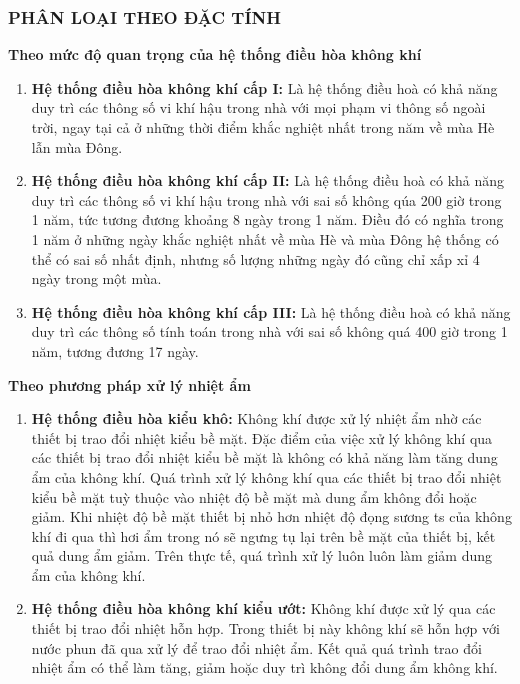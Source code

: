	\subsubsection{PHÂN LOẠI THEO ĐẶC TÍNH}
	\textbf{Theo mức độ quan trọng của hệ thống điều hòa không khí}
	\begin{enumerate}
		\setlength\parindent{2cm}
		\item \textbf{Hệ thống điều hòa không khí cấp I:} Là hệ thống điều hoà có khả năng duy trì các thông số vi khí hậu trong nhà với mọi phạm vi thông số ngoài trời, ngay tại cả ở những thời điểm khắc nghiệt nhất trong năm về mùa Hè lẫn mùa Đông.
		\item \textbf{Hệ thống điều hòa không khí cấp II:} Là hệ thống điều hoà có khả năng duy trì các thông số vi khí hậu trong nhà với sai số không qúa 200 giờ trong 1 năm, tức tương đương khoảng 8 ngày trong 1 năm. Điều đó có nghĩa trong 1 năm ở những ngày khắc nghiệt nhất về mùa Hè và mùa Đông hệ thống có thể có sai số nhất định, nhưng số lượng những ngày đó cũng chỉ xấp xỉ 4 ngày trong một mùa.
		\item \textbf{Hệ thống điều hòa không khí cấp III:} Là hệ thống điều hoà có khả năng duy trì các thông số tính toán trong nhà với sai số không quá 400 giờ trong 1 năm, tương đương 17 ngày.
	\end{enumerate}
	
	\textbf{Theo phương pháp xử lý nhiệt ẩm}
	\begin{enumerate}
		\setlength\itemsep{1mm}
		\item \textbf{Hệ thống điều hòa kiểu khô:} Không khí được xử lý nhiệt ẩm nhờ các thiết bị trao đổi nhiệt kiểu bề mặt. Đặc điểm của việc xử lý không khí qua các thiết bị trao đổi nhiệt kiểu bề mặt là không có khả năng làm tăng dung ẩm của không khí. Quá trình xử lý không khí qua các thiết bị trao đổi nhiệt kiểu bề mặt tuỳ thuộc vào nhiệt độ bề mặt mà dung ẩm không đổi hoặc giảm. Khi nhiệt độ bề mặt thiết bị nhỏ hơn nhiệt độ đọng sương ts của không khí đi qua thì hơi ẩm trong nó sẽ ngưng tụ lại trên bề mặt của thiết bị, kết quả dung ẩm giảm. Trên thực tế, quá trình xử lý luôn luôn làm giảm dung ẩm của không khí.
		\item \textbf{Hệ thống điều hòa không khí kiểu ướt:} Không khí được xử lý qua các thiết bị trao đổi nhiệt hỗn hợp. Trong thiết bị này không khí sẽ hỗn hợp với nước phun đã qua xử lý để trao đổi nhiệt ẩm. Kết quả quá trình trao đổi nhiệt ẩm có thể làm tăng, giảm hoặc duy trì không đổi dung ẩm không khí.
	\end{enumerate}
	
